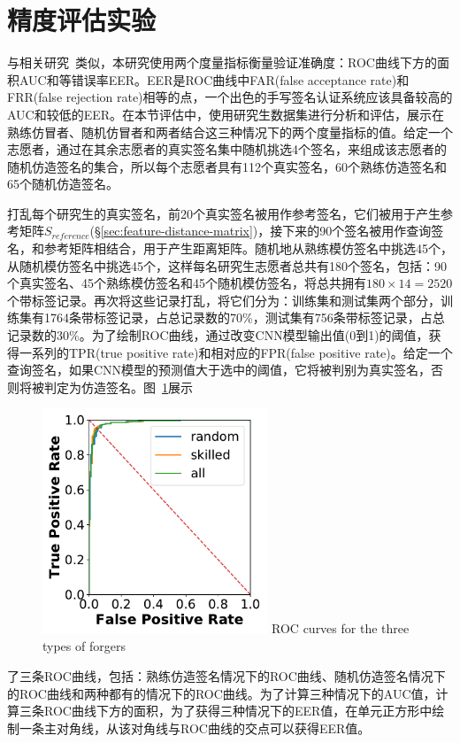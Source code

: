 \section{精度评估实验}
\label{sec:accuracy-experiment}

与相关研究~\cite{fischer2015robust,levy2018handwritten}类似，本研究使用两个度量指标衡量验证准确度：ROC曲线下方的面积AUC和等错误率EER。EER是ROC曲线中FAR(false acceptance rate)和FRR(false rejection rate)相等的点，一个出色的手写签名认证系统应该具备较高的AUC和较低的EER。在本节评估中，使用研究生数据集进行分析和评估，展示在熟练仿冒者、随机仿冒者和两者结合这三种情况下的两个度量指标的值。给定一个志愿者，通过在其余志愿者的真实签名集中随机挑选4个签名，来组成该志愿者的随机仿造签名的集合，所以每个志愿者具有112个真实签名，60个熟练仿造签名和65个随机仿造签名。

打乱每个研究生的真实签名，前20个真实签名被用作参考签名，它们被用于产生参考矩阵$S_{reference}$(\S\ref{sec:feature-distance-matrix})，接下来的90个签名被用作查询签名，和参考矩阵相结合，用于产生距离矩阵。随机地从熟练模仿签名中挑选45个，从随机模仿签名中挑选45个，这样每名研究生志愿者总共有180个签名，包括：90个真实签名、45个熟练模仿签名和45个随机模仿签名，将总共拥有$180\times 14=2520$个带标签记录。再次将这些记录打乱，将它们分为：训练集和测试集两个部分，训练集有1764条带标签记录，占总记录数的70\%，测试集有756条带标签记录，占总记录数的30\%。为了绘制ROC曲线，通过改变CNN模型输出值(0到1)的阈值，获得一系列的TPR(true positive rate)和相对应的FPR(false positive rate)。给定一个查询签名，如果CNN模型的预测值大于选中的阈值，它将被判别为真实签名，否则将被判定为仿造签名。图~\ref{fig:roc-forgers}展示
\begin{figure}
  \centering
  \includegraphics[width=0.6\textwidth]{figure/mimic-random-total-ROC-curves.pdf}
      {ROC curves for the three types of forgers}
  \label{fig:roc-forgers}
\end{figure}
了三条ROC曲线，包括：熟练仿造签名情况下的ROC曲线、随机仿造签名情况下的ROC曲线和两种都有的情况下的ROC曲线。为了计算三种情况下的AUC值，计算三条ROC曲线下方的面积，为了获得三种情况下的EER值，在单元正方形中绘制一条主对角线，从该对角线与ROC曲线的交点可以获得EER值。

